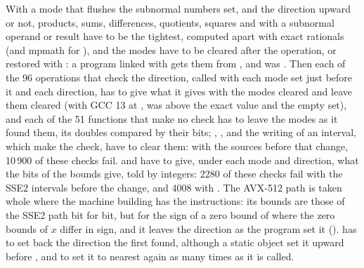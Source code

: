\documentclass[12pt,a4paper,twoside,openright]{book}
\begin{document}
\medskip
With a mode that flushes the subnormal numbers set, and the direction upward
or not, products, sums, differences, quotients, squares and  with
a subnormal operand or result have to be the tightest, computed apart with
exact rationals (and mpmath for ), and the modes have to be
cleared after the operation, or restored with
: a program linked with  gets
them from , and \code{[1e-300] * [1e-20]} was
\code{[0, 0]}.\newinvfive{} Then each of the 96 operations that check the
direction, called with each mode set just before it and each direction, has
to give what it gives with the modes cleared and leave them cleared (with
GCC 13 at ,  was above the exact
value and  the empty set), and each of the 51
functions that make no check has to leave the modes as it found them, its
doubles compared by their bits; , ,
 and the writing of an interval, which make the check, have to
clear them: with the sources before that change, 10\,900 of these checks
fail.\newinvfive{}  and  have to
give, under each mode and direction, what the bits of the bounds give, told
by integers: 2280 of these checks fail with the SSE2 intervals before the
change, and 4008 with . The AVX-512 path is
taken whole where the machine building has the instructions: its bounds are
those of the SSE2 path bit for bit, but for the sign of a zero bound of
 where the zero bounds of $x$ differ in sign, and it leaves the
direction as the program set it ().\newinvfive{}
 has to set back the direction the first
 found, although a static object set it upward before
, and  to set it to nearest
again as many times as it is called.
\end{document}
